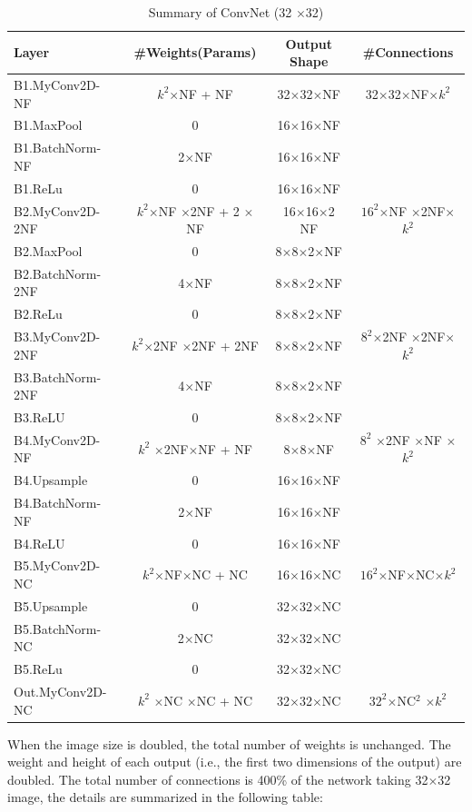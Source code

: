 \documentclass[12pt]{article}
\newcommand{\m}[0]{$\times$}
\begin{document}
	\begin{table}[H]
		\centering
		\small
		\caption{Summary of ConvNet (32 \m 32)}
		\begin{tabular}{l|c c c}
			\toprule
			Layer & \#Weights(Params) & Output Shape & \#Connections\\
			\midrule
			B1.MyConv2D-NF & $k^2$\m NF + NF & 32\m 32\m NF & 32\m 32\m NF\m $k^2$ \\
			B1.MaxPool & 0 & 16\m 16\m NF & \\
			B1.BatchNorm-NF & 2\m NF & 16\m 16\m NF & \\
			B1.ReLu & 0 & 16\m 16\m NF & \\
			\midrule
			B2.MyConv2D-2NF & $k^2$\m NF \m 2NF + 2 \m NF & 16\m 16\m 2 NF & $16^2$\m NF \m 2NF\m $k^2$ \\
			B2.MaxPool & 0 & 8\m 8\m 2\m NF & \\
			B2.BatchNorm-2NF & 4\m NF & 8\m 8\m 2\m NF & \\
			B2.ReLu & 0 & 8\m 8\m 2\m NF & \\
			\midrule
			B3.MyConv2D-2NF & $k^2$\m 2NF \m 2NF + 2NF & 8\m 8\m 2\m NF& $8^2$\m 2NF \m 2NF\m $k^2$ \\
			B3.BatchNorm-2NF & 4\m NF & 8\m 8\m 2\m NF & \\
			B3.ReLU & 0 & 8\m 8\m 2\m NF & \\
			\midrule
			B4.MyConv2D-NF & $k^2$ \m 2NF\m NF + NF& 8\m 8\m NF & $8^2$ \m 2NF \m NF \m $k^2$ \\
			B4.Upsample & 0 & 16\m 16\m NF & \\
			B4.BatchNorm-NF & 2\m NF & 16\m 16\m NF & \\
			B4.ReLU & 0 & 16\m 16\m NF & \\
			\midrule
			B5.MyConv2D-NC & $k^2$\m NF\m NC + NC& 16\m 16\m NC & $16^2$\m NF\m NC\m $k^2$ \\
			B5.Upsample & 0 & 32\m 32\m NC & \\
			B5.BatchNorm-NC & 2\m NC & 32\m 32\m NC & \\
			B5.ReLu & 0 & 32\m 32\m NC & \\
			\midrule
			Out.MyConv2D-NC & $k^2$ \m NC \m NC + NC& 32\m 32\m NC & $32^2$\m NC$^2$ \m $k^2$ \\
			\bottomrule
		\end{tabular}
	\end{table}
	When the image size is doubled, the total number of weights is unchanged. The weight and height of each output (i.e., the first two dimensions of the output) are doubled. The total number of connections is 400\% of the network taking 32\m 32 image, the details are summarized in the following table:
\end{document}
